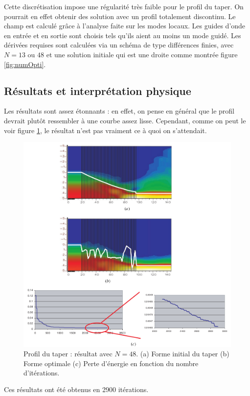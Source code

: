 \documentclass{article}
\begin{document}
\bigskip
Cette discrétisation impose une régularité très faible pour le profil du taper. On pourrait en effet obtenir des solution avec un profil totalement discontinu. Le champ est calculé grâce à l'analyse faite sur les modes locaux. Les guides d'onde en entrée et en sortie sont choisis tels qu'ils aient au moins un mode guidé. Les dérivées requises sont calculées via un schéma de type différences finies, avec $N=13$ ou $48$ et une solution initiale qui est une droite comme montrée figure \ref{fig:numOpti}.

\subsection{Résultats et interprétation physique}
Les résultats sont assez étonnants : en effet, on pense en général que le profil devrait plutôt ressembler à une courbe assez lisse. Cependant, comme on peut le voir figure \ref{fig:result48}, le résultat n'est pas vraiment ce à quoi on s'attendait. 
\begin{figure}[!h]
	\centering
	\includegraphics[scale=0.25]{images/result48.png}
	\caption{Profil du taper : résultat avec $N=48$. (a) Forme initial du taper (b) Forme optimale (c) Perte d'énergie en fonction du nombre d'itérations.}
	\label{fig:result48}
\end{figure}
Ces résultats ont été obtenus en 2900 itérations.\\
\end{document}
